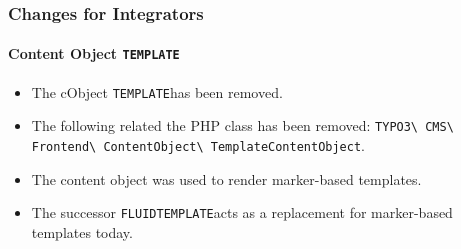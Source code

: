 %

\begin{frame}[fragile]
	\frametitle{Changes for Integrators}
	\framesubtitle{Content Object \small\texttt{TEMPLATE}\normalsize}


	\begin{itemize}
		\item The cObject \small\texttt{TEMPLATE}\normalsize has been removed.
		\item The following related the PHP class has been removed:\newline
			\small\texttt{TYPO3\textbackslash
				CMS\textbackslash
				Frontend\textbackslash
				ContentObject\textbackslash
				TemplateContentObject}.\normalsize
		\item The content object was used to render marker-based templates.
		\item The successor \small\texttt{FLUIDTEMPLATE}\normalsize acts as a
			replacement for marker-based templates today.
	\end{itemize}
\end{frame}

